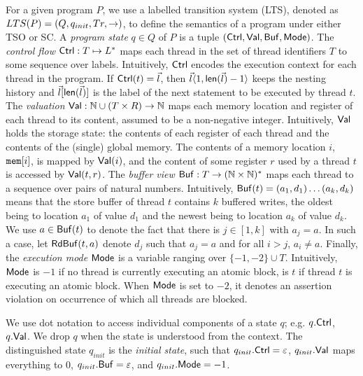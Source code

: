 For a given program $P$, we use a labelled transition system (LTS), denoted as $\mathnormal{LTS}(P)=(Q,q_{init},Tr,\rightarrow)$, to define the semantics of a program under either TSO or SC.
A {\em program state} $q\in Q$ of $P$ is a tuple $(\mathsf{Ctrl},\mathsf{Val},\mathsf{Buf},\mathsf{Mode})$.
The {\em control flow} $\mathsf{Ctrl}:T \mapsto L^*$ maps each thread in the set of thread identifiers $T$ to some sequence over labels.
Intuitively, $\mathsf{Ctrl}$ encodes the execution context for each thread in the program.
If $\mathsf{Ctrl}(t)=\vec{l}$, then $\vec{l} \langle 1,\mathsf{len}(\vec{l})-1\rangle$ keeps the nesting history and $\vec{l}[\mathsf{len}(\vec{l})]$ is the label of the next statement to be executed by thread $t$.
The {\em valuation} $\mathsf{Val}:\mathbb{N}\cup (T\times R) \rightarrow \mathbb{N}$ maps each memory location and register of each thread to its content, assumed to be a non-negative integer.
Intuitively, $\mathsf{Val}$ holds the storage state: the contents of each register of each thread and the contents of the (single) global memory.
The contents of a memory location $i$, $\mathtt{mem}[i]$, is mapped by $\mathsf{Val}(i)$, and the content of some register $r$ used by a thread $t$ is accessed by $\mathsf{Val}(t,r)$.
The {\em buffer view} $\mathsf{Buf}:T \rightarrow (\mathbb{N}\times\mathbb{N})^*$ maps each thread to a sequence over pairs of natural numbers.
Intuitively, $\mathsf{Buf}(t)=(a_1,d_1)\ldots(a_k,d_k)$ means that the store buffer of thread $t$ contains $k$ buffered writes, the oldest being to location $a_1$ of value $d_1$ and the newest being to location $a_k$ of value $d_k$.
We use $a\in\mathsf{Buf}(t)$ to denote the fact that there is $j\in[1,k]$ with $a_j=a$.
In such a case, let $\mathsf{RdBuf}(t,a)$ denote $d_j$ such that $a_j=a$ and for all $i>j$, $a_i\neq a$.
Finally, the {\em execution mode} $\mathsf{Mode}$ is a variable ranging over $\{-1,-2\}\cup T$.
Intuitively, $\mathsf{Mode}$ is $-1$ if no thread is currently executing an atomic block, is $t$ if thread $t$ is executing an atomic block.
When $\mathsf{Mode}$ is set to $-2$, it denotes an assertion violation on occurrence of which all threads are blocked.

We use dot notation to access individual components of a state $q$; e.g. $q.\mathsf{Ctrl}$, $q.\mathsf{Val}$.
We drop $q$ when the state is understood from the context.
The distinguished state $q_{init}$ is the {\em initial state}, such that $q_{init}.\mathsf{Ctrl}=\varepsilon$, $q_{init}.\mathsf{Val}$ maps everything to 0, $q_{init}.\mathsf{Buf}=\varepsilon$, and $q_{init}.\mathsf{Mode}=-1$.

